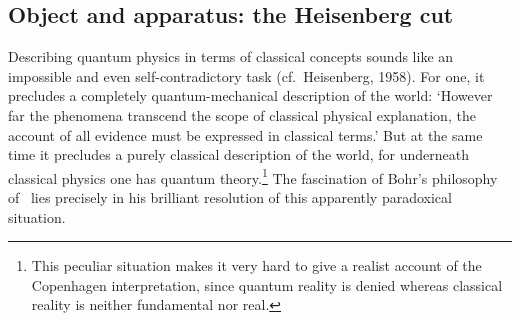 \documentclass[12pt,titlepage]{article}
\begin{document}
  \subsection{Object and apparatus: the Heisenberg cut}\label{HC}
Describing quantum physics in terms of classical concepts 
 sounds like an impossible and even self-contradictory task (cf.\ Heisenberg, 1958).  For one, it precludes a completely quantum-mechanical description of the world: `However far the phenomena transcend the scope of classical physical explanation, the account of all evidence must be expressed in classical terms.' But at the same time it precludes a purely classical description of the world, for underneath classical physics one has quantum theory.\footnote{This peculiar situation makes it very hard to give a realist account of the Copenhagen interpretation, since quantum reality is denied whereas classical reality is neither fundamental nor real.} The fascination of Bohr's philosophy of \qm\ lies precisely in his brilliant resolution of this apparently paradoxical situation.  
 
\end{document}
